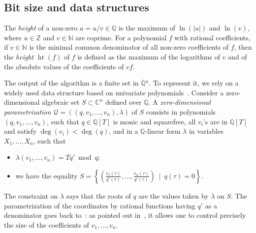 \documentclass[a4paper]{article}
\def\scrQ{\ensuremath{\mathscr{Q}}}
\DeclareMathOperator{\htt}{ht}
\def\C{\mathbb{C}}
\def\Q{\mathbb{Q}}
\begin{document}
\subsection{Bit size and data structures}
The {\em height} of a non-zero $a=u/v \in \Q$ is the maximum of
$\ln(|u|)$ and $\ln(v),$ where $u \in \mathbb{Z}$ and $v \in
\mathbb{N}$ are coprime. For a polynomial $f$ with rational
coefficients, if $v \in \mathbb N$ is the minimal common denominator
of all non-zero coefficients of $f$, then the \textit{height}
$\htt(f)$ of $f$ is defined as the maximum of the logarithms of $v$
and of the absolute values of the coefficients of $vf$.


The output of the algorithm is a finite set in $\overline{\Q}{}^n$. To
represent it, we rely on a widely used data structure based on
univariate
polynomials~\cite{Kronecker82,Macaulay16,GiMo89,GiHeMoPa95,ABRW,GiHaHeMoMoPa97,GiHeMoMoPa98,Rouillier99}.
Consider a zero-dimensional algebraic set $S \subset \C^n$ defined
over $\Q$. A {\em zero-dimensional parametrization}
$\scrQ=((q,v_1,\dots,v_n),\lambda)$ of $S$ consists in polynomials
$(q,v_1,\dots,v_n)$, such that $q\in \Q[T]$ is monic and squarefree,
all $v_i$'s are in $\Q[T]$ and satisfy $\deg(v_i) < \deg(q)$, and in a
$\Q$-linear form $\lambda$ in variables $X_1,\dots,X_n$, such that
\begin{itemize}
\item $\lambda(v_1,\dots,v_n)=T q' \bmod q$;
\item we have the equality
  $S=\left \{\left(
      \frac{v_1(\tau)}{q'(\tau)},\dots,\frac{v_n(\tau)}{q'(\tau)}\right
    ) \ \mid \ q(\tau)=0 \right \}.$
\end{itemize}
The constraint on $\lambda$ says that the roots of $q$ are the values
taken by $\lambda$ on $S$. The parametrization of the coordinates by
rational functions having $q'$ as a denominator goes back
to~\cite{Kronecker82,Macaulay16}: as pointed out in~\cite{ABRW}, it
allows one to control precisely the size of the coefficients of
$v_1,\dots,v_n$.













\end{document}
